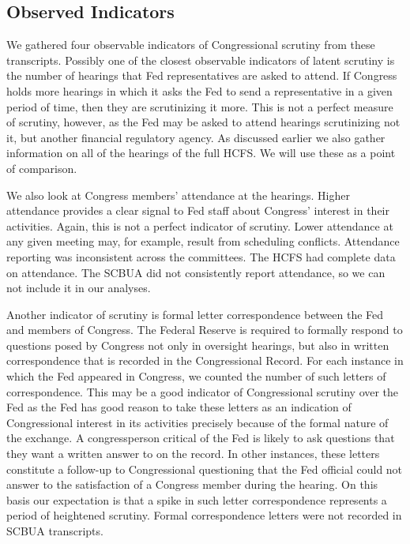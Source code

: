 \documentclass[a4paper]{article}\usepackage[]{graphicx}\usepackage[]{color}
\begin{document}
\subsection{Observed Indicators}

We gathered four observable indicators of Congressional scrutiny from these transcripts. Possibly one of the closest observable indicators of latent scrutiny is the number of hearings that Fed representatives are asked to attend. If Congress holds more hearings in which it asks the Fed to send a representative in a given period of time, then they are scrutinizing it more. This is not a perfect measure of scrutiny, however, as the Fed may be asked to attend hearings scrutinizing not it, but another financial regulatory agency. As discussed earlier we also gather information on all of the hearings of the full HCFS. We will use these as a point of comparison.

We also look at Congress members' attendance at the hearings. Higher attendance provides a clear signal to Fed staff about Congress' interest in their activities. Again, this is not a perfect indicator of scrutiny. Lower attendance at any given meeting may, for example, result from scheduling conflicts. Attendance reporting was inconsistent across the committees. The HCFS had complete data on attendance. The SCBUA did not consistently report attendance, so we can not include it in our analyses.

Another indicator of scrutiny is formal letter correspondence between the Fed and members of Congress. The Federal Reserve is required to formally respond to questions posed by Congress not only in oversight hearings, but also in written correspondence that is recorded  in the Congressional Record. For each instance in which the Fed appeared in Congress, we counted the number of such letters of correspondence. This may be a good indicator of Congressional scrutiny over the Fed as the Fed has good reason to take these letters as an indication of Congressional interest in its activities precisely because of the formal nature of the exchange. A congressperson critical of the Fed is likely to ask questions that they want a written answer to on the record. In other instances, these letters constitute a follow-up to Congressional questioning that the Fed official could not answer to the satisfaction of a Congress member during the hearing. On this basis our expectation is that a spike in such letter correspondence represents a period of heightened scrutiny. Formal correspondence letters were not recorded in SCBUA transcripts.
\end{document}
